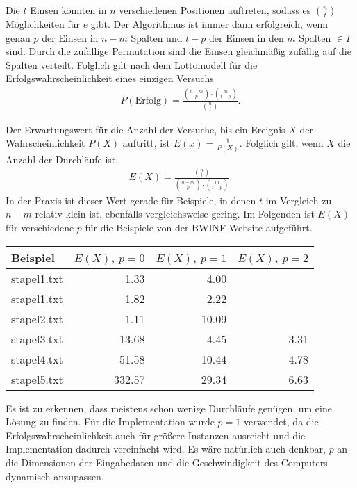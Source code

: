 \documentclass[a4paper,10pt,ngerman]{scrartcl}
\begin{document}
Die $t$ Einsen könnten in $n$ verschiedenen Positionen auftreten, sodass es $\binom{n}{t}$ Möglichkeiten für $e$ gibt. Der Algorithmus ist immer dann erfolgreich, wenn genau $p$ der Einsen in $n-m$ Spalten und $t-p$ der Einsen in den $m$ Spalten $\in I$ sind. Durch die zufällige Permutation sind die Einsen gleichmäßig zufällig auf die Spalten verteilt. Folglich gilt nach dem Lottomodell für die Erfolgswahrscheinlichkeit eines einzigen Versuchs
\begin{align*}
    P(\text{Erfolg}) = \frac{\binom{n-m}{p} \cdot \binom{m}{t-p}}{\binom{n}{t}}.
\end{align*}

Der Erwartungswert für die Anzahl der Versuche, bis ein Ereignis $X$ der Wahrscheinlichkeit $P(X)$ auftritt, ist $E(x) = \frac{1}{P(X)}$.
Folglich gilt, wenn $X$ die Anzahl der Durchläufe ist,
\begin{align*}
    E(X) = \frac{\binom{n}{t}}{\binom{n-m}{p} \cdot \binom{m}{t-p}}.
\end{align*} 
In der Praxis ist dieser Wert gerade für Beispiele, in denen $t$ im Vergleich zu $n-m$ relativ klein ist, ebenfalls vergleichsweise gering. 
Im Folgenden ist $E(X)$ für verschiedene $p$ für die Beispiele von der BWINF-Website aufgeführt.
\begin{table}[H]
    \centering
    \begin{tabular}{lrrr}
        \toprule
    
        Beispiel & $E(X)$, $p=0$ & $E(X)$, $p=1$ & $E(X)$, $p=2$ \\\midrule
        stapel1.txt &1.33	&4.00 &  \\
        stapel1.txt &1.82&	2.22&  \\
        stapel2.txt &1.11	&10.09&  \\
    stapel3.txt &13.68&	4.45&	3.31 \\
    stapel4.txt	&51.58&	10.44 &4.78 \\
    stapel5.txt	&332.57	&29.34&	6.63\\\bottomrule
    \end{tabular}
\end{table}
Es ist zu erkennen, dass meistens schon wenige Durchläufe genügen, um eine Lösung zu finden. 
Für die Implementation wurde $p=1$ verwendet, da die Erfolgswahrscheinlichkeit auch für größere Instanzen ausreicht und die Implementation dadurch vereinfacht wird. Es wäre natürlich auch denkbar, $p$ an die Dimensionen der Eingabedaten und die Geschwindigkeit des Computers dynamisch anzupassen.
\end{document}
